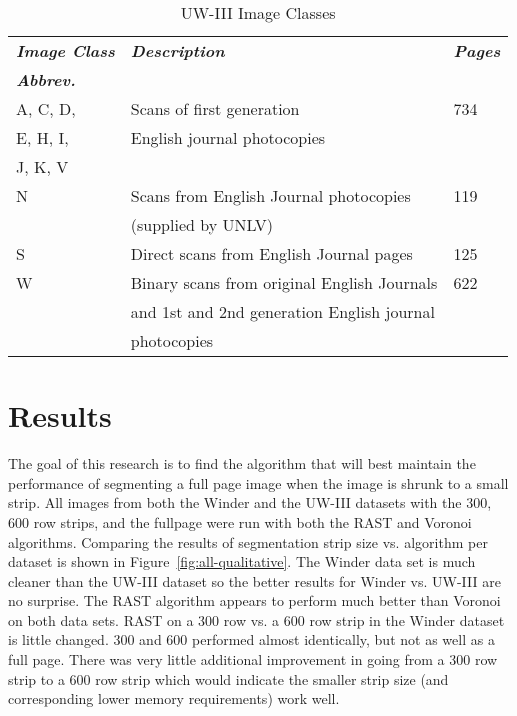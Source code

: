 \documentclass[conference]{IEEEtran}
\begin{document}
\begin{table}
\caption{UW-III Image Classes}
\label{table:UW-III Image Classes}
\begin{tabular}{|l|l|l|}
\hline
\textit{\textbf{Image Class}} & \textit{\textbf{Description}} & \textit{\textbf{Pages}}  \\ 
\textit{\textbf{Abbrev.}} & & \\ 
\hline
    \hline
    A, C, D,   & Scans of first generation & 734 \\
    E, H, I,   & English journal photocopies & \\ 
    J, K, V    &  & \\ 
    \hline
    N & Scans from English Journal photocopies & 119 \\ 
      & (supplied by UNLV) & \\ 
    \hline
    S & Direct scans from English Journal pages & 125 \\ 
    \hline
    W & Binary scans from original English Journals & 622 \\
      & and 1st and 2nd generation English journal & \\
      & photocopies  & \\ 
    \hline
\end{tabular}
\end{table}

\section{Results}

The goal of this research is to find the algorithm that will best
maintain the performance of segmenting a full page image when the image is shrunk to a small strip. 
All images from both the Winder and the UW-III datasets with 
the 300, 600 row strips, and the fullpage were run with both the RAST and
Voronoi algorithms. 
Comparing the results of segmentation strip size vs. algorithm per dataset
is shown in Figure~\ref{fig:all-qualitative}. 
The Winder data set is much cleaner than the UW-III dataset 
so the better results for Winder vs. UW-III are no surprise. 
The RAST algorithm appears to perform much better than Voronoi on both data sets.
RAST on a 300 row vs. a 600 row strip in the Winder dataset is little changed.
300 and 600 performed almost identically, but not as well as a full page. There
was very little additional improvement in going from a 300 row strip to a 600
row strip which would indicate the smaller strip size (and corresponding lower
memory requirements) work well.
\end{document}
